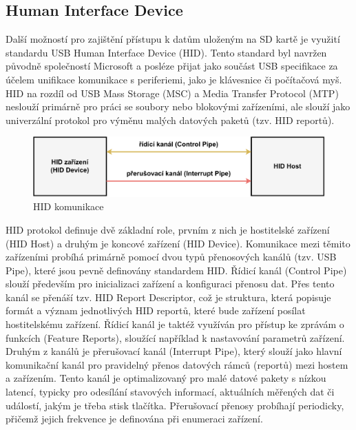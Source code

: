 \subsection{Human Interface Device}
Další možností pro zajištění přístupu k datům uloženým na SD kartě je využití standardu USB Human Interface Device (HID). Tento standard byl navržen původně společností Microsoft a posléze přijat jako součást USB specifikace za účelem unifikace komunikace s periferiemi, jako je klávesnice či počítačová myš. HID na rozdíl od USB Mass Storage (MSC) a Media Transfer Protocol (MTP) neslouží primárně pro práci se soubory nebo blokovými zařízeními, ale slouží jako univerzální protokol pro výměnu malých datových paketů (tzv. HID reportů). \cite{usb_standard_hid, silicon_labs_human_interface_device}

\begin{figure}[h]
    \centering
    \includegraphics[width=1.00\textwidth]{obrazky-figures/hid_communication-cz.pdf}
    
    \caption{HID komunikace \cite{usb_standard_hid}}
    \label{fig:hid-communication}
\end{figure}

HID protokol definuje dvě základní role, prvním z nich je hostitelské zařízení (HID Host) a druhým je koncové zařízení (HID Device). Komunikace mezi těmito zařízeními probíhá primárně pomocí dvou typů přenosových kanálů (tzv. USB Pipe), které jsou pevně definovány standardem HID. Řídicí kanál (Control Pipe) slouží především pro inicializaci zařízení a konfiguraci přenosu dat. Přes tento kanál se přenáší tzv. HID Report Descriptor, což je struktura, která popisuje formát a význam jednotlivých HID reportů, které bude zařízení posílat hostitelskému zařízení. Řídicí kanál je taktéž využíván pro přístup ke zprávám o funkcích (Feature Reports), sloužící například k nastavování parametrů zařízení. Druhým z kanálů je přerušovací kanál (Interrupt Pipe), který slouží jako hlavní komunikační kanál pro pravidelný přenos datových rámců (reportů) mezi hostem a zařízením. Tento kanál je optimalizovaný pro malé datové pakety s nízkou latencí, typicky pro odesílání stavových informací, aktuálních měřených dat či událostí, jakým je třeba stisk tlačítka. Přerušovací přenosy probíhají periodicky, přičemž jejich frekvence je definována při enumeraci zařízení. \cite{usb_standard_hid, silicon_labs_human_interface_device}

